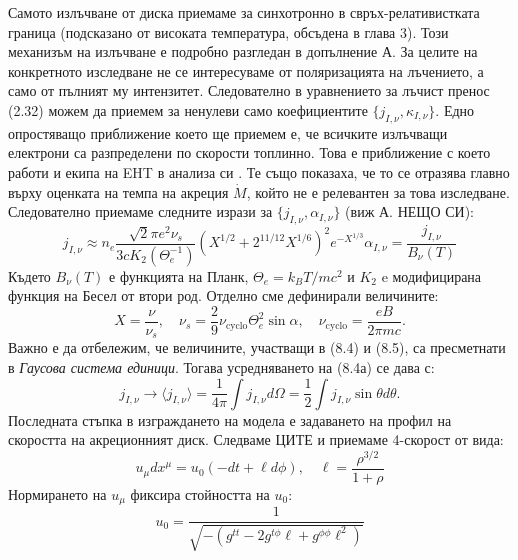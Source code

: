 Самото излъчване от диска приемаме за синхотронно в свръх-релативистката граница (подсказано от високата температура, обсъдена в глава 3). Този механизъм на излъчване е подробно разгледан в допълнение А. За целите на конкретното изследване не се интересуваме от поляризацията на лъчението, а само от пълният му интензитет. Следователно в уравнението за лъчист пренос (2.32) можем да приемем за ненулеви само коефициентите $\{j_{I,\nu}, \kappa_{I,\nu}\}.$ Едно опростяващо приближение което ще приемем е, че всичките излъчващи електрони са разпределени по скорости топлинно. Това е приближение с което работи и екипа на EHT в анализа си \cite{EHT_M87_VIII}. Те също показаха, че то се отразява главно върху оценката на темпа на акреция $\dot{M}$, който не е релевантен за това изследване. Следователно приемаме следните изрази за $\{j_{I,\nu}, \alpha_{I,\nu}\}$ (виж А. НЕЩО СИ):
\begin{subequations}
	\begin{equation}
		j_{I,\nu}\approx n_e \frac{\sqrt{2}\pi e^2\nu_s}{3cK_2(\Theta_e^{-1})}\left(X^{1/2} + 2^{11/12}X^{1/6}\right)^2 e^{-X^{1/3}}
	\end{equation}
	\begin{equation}
		\alpha_{I,\nu} = \frac{j_{I,\nu}}{B_\nu(T)}
	\end{equation}
\end{subequations}
Където $B_\nu(T)$ е функцията на Планк, $\Theta_e = k_BT/mc^2$ и $K_2$ e модифицирана функция на Бесел от втори род. Отделно сме дефинирали величините:
\begin{equation}
	X = \frac{\nu}{\nu_s},\quad \nu_s = \frac{2}{9}\nu_\text{cyclo}\Theta_e^2\sin\alpha, \quad \nu_\text{cyclo} = \frac{eB}{2\pi m c}.
\end{equation}
Важно е да отбележим, че величините, участващи в (8.4) и (8.5), са пресметнати в \emph{Гаусова система единици}. Тогава усредняването на (8.4а) се дава с:
\begin{equation}
	j_{I,\nu}\rightarrow\langle j_{I,\nu} \rangle = \frac{1}{4\pi}\int j_{I,\nu} d\Omega = \frac{1}{2}\int j_{I,\nu} \sin\theta d\theta.
\end{equation}
Последната стъпка в изграждането на модела е задаването на профил на скоростта на акреционният диск. Следваме ЦИТЕ и приемаме 4-скорост от вида:
\begin{equation}
	u_\mu dx^\mu = u_0(-dt + \ell d\phi),\quad \ell = \frac{\rho^{3/2}}{1 +\rho}
\end{equation}
Нормирането на $u_\mu$ фиксира стойността на $u_0$:
\begin{equation}
	u_0 = \frac{1}{\sqrt{-(g^{tt} - 2g^{t\phi}\ell + g^{\phi\phi}\ell^2)}}
\end{equation}
